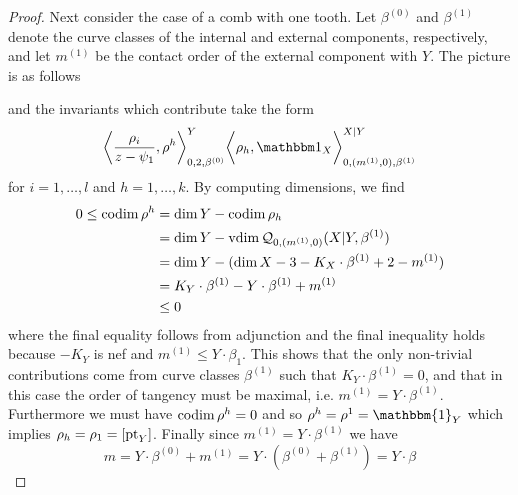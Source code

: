 \begin{proof}
Next consider the case of a comb with one tooth. Let $\beta^{(0)}$ and $\beta^{(1)}$ denote the curve classes of the internal and external components, respectively, and let $m^{(1)}$ be the contact order of the external component with $Y$. The picture is as follows
\begin{center}
\end{center}
and the invariants which contribute take the form
\begin{equation*} \bigg\langle \dfrac{\rho_i}{z-\psi_1},\rho^h\bigg\rangle_{0,2,\beta^{(0)}}^Y \bigg\langle \rho_h, \mathbbm 1_{X}\bigg\rangle_{0,(m^{(1)},0),\beta^{(1)}}^{X|Y} \end{equation*}
for $i = 1, \ldots, l$ and $h = 1, \ldots, k$. By computing dimensions, we find
\begin{align*}
0\leq \operatorname{codim} \rho^h &= \dim Y-\operatorname{codim} \rho_h \\
&= \dim Y-\operatorname{vdim} \mathcal{Q}_{0,(m^{(1)},0)}(X|Y,\beta^{(1)}) \\
&= \dim Y-(\dim X-3-K_{X}\cdot \beta^{(1)}+2-m^{(1)})\\
&= K_Y \cdot \beta^{(1)} - Y \cdot \beta^{(1)}+m^{(1)} \\
&\leq 0
\end{align*}
where the final equality follows from adjunction and the final inequality holds because $-K_Y$ is nef and $m^{(1)}\leq Y \cdot \beta_1$. This shows that the only non-trivial contributions come from curve classes $\beta^{(1)}$ such that $K_Y \cdot \beta^{(1)}=0$, and that in this case the order of tangency must be maximal, i.e. $m^{(1)}=Y \cdot \beta^{(1)}$. Furthermore we must have $\operatorname{codim} \rho^h = 0$ and so $\rho^h = \rho^1 = \mathbbm{1}_Y$ which implies $\rho_h = \rho_1 = [\operatorname{pt}_Y]$. Finally since $m^{(1)}=Y \cdot \beta^{(1)}$ we have
\begin{equation*} m = Y \cdot \beta^{(0)}+m^{(1)}=Y \cdot (\beta^{(0)} + \beta^{(1)}) = Y \cdot \beta \end{equation*}

\end{proof}
